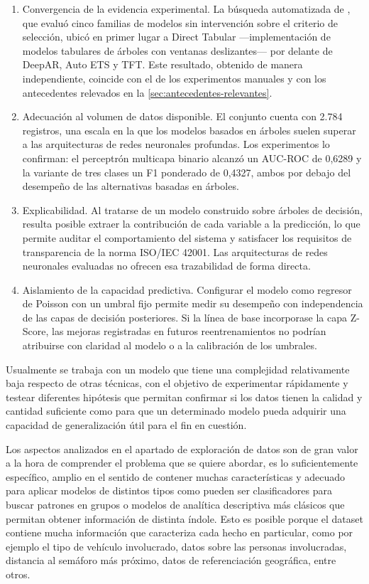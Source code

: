 \begin{enumerate}[label=\alph*)]
  \item Convergencia de la evidencia experimental. La búsqueda automatizada de \autogluonts{}, que evaluó cinco familias de modelos sin intervención sobre el criterio de selección, ubicó en primer lugar a Direct Tabular ---implementación de modelos tabulares de árboles con ventanas deslizantes--- por delante de DeepAR, Auto ETS y TFT. Este resultado, obtenido de manera independiente, coincide con el de los experimentos manuales y con los antecedentes relevados en la \cref{sec:antecedentes-relevantes}.
  \item Adecuación al volumen de datos disponible. El conjunto cuenta con 2.784 registros, una escala en la que los modelos basados en árboles suelen superar a las arquitecturas de redes neuronales profundas. Los experimentos lo confirman: el perceptrón multicapa binario alcanzó un AUC-ROC de 0,6289 y la variante de tres clases un F1 ponderado de 0,4327, ambos por debajo del desempeño de las alternativas basadas en árboles.
  \item Explicabilidad. Al tratarse de un modelo construido sobre árboles de decisión, resulta posible extraer la contribución de cada variable a la predicción, lo que permite auditar el comportamiento del sistema y satisfacer los requisitos de transparencia de la norma ISO/IEC 42001. Las arquitecturas de redes neuronales evaluadas no ofrecen esa trazabilidad de forma directa.
  \item Aislamiento de la capacidad predictiva. Configurar el modelo como regresor de Poisson con un umbral fijo permite medir su desempeño con independencia de las capas de decisión posteriores. Si la línea de base incorporase la capa Z-Score, las mejoras registradas en futuros reentrenamientos no podrían atribuirse con claridad al modelo o a la calibración de los umbrales.
\end{enumerate}

Usualmente se trabaja con un modelo que tiene una complejidad relativamente baja respecto de otras técnicas, con el objetivo de experimentar rápidamente y testear diferentes hipótesis que permitan confirmar si los datos tienen la calidad y cantidad suficiente \autocite{zheng2018} como para que un determinado modelo pueda adquirir una capacidad de generalización útil para el fin en cuestión.

Los aspectos analizados en el apartado de exploración de datos son de gran valor a la hora de comprender el problema que se quiere abordar, es lo suficientemente específico, amplio en el sentido de contener muchas características y adecuado para aplicar modelos de distintos tipos como pueden ser clasificadores para buscar patrones en grupos o modelos de analítica descriptiva más clásicos que permitan obtener información de distinta índole. Esto es posible porque el dataset contiene mucha información que caracteriza cada hecho en particular, como por ejemplo el tipo de vehículo involucrado, datos sobre las personas involucradas, distancia al semáforo más próximo, datos de referenciación geográfica, entre otros.

